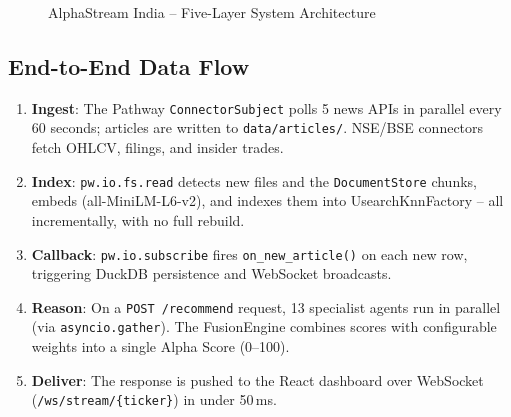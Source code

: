 \documentclass[11pt, a4paper]{article}
\begin{document}
\begin{figure}[H]
\caption{AlphaStream India -- Five-Layer System Architecture}
\end{figure}

\subsection{End-to-End Data Flow}

\begin{enumerate}[leftmargin=1.8em, itemsep=3pt]
  \item \textbf{Ingest}: The Pathway \texttt{ConnectorSubject} polls 5 news APIs in
        parallel every 60 seconds; articles are written to \texttt{data/articles/}.
        NSE/BSE connectors fetch OHLCV, filings, and insider trades.
  \item \textbf{Index}: \texttt{pw.io.fs.read} detects new files and the
        \texttt{DocumentStore} chunks, embeds (all-MiniLM-L6-v2), and indexes them
        into UsearchKnnFactory -- all incrementally, with no full rebuild.
  \item \textbf{Callback}: \texttt{pw.io.subscribe} fires \texttt{on\_new\_article()}
        on each new row, triggering DuckDB persistence and WebSocket broadcasts.
  \item \textbf{Reason}: On a \texttt{POST /recommend} request, 13 specialist agents
        run in parallel (via \texttt{asyncio.gather}). The FusionEngine combines scores
        with configurable weights into a single Alpha Score (0--100).
  \item \textbf{Deliver}: The response is pushed to the React dashboard over
        WebSocket (\texttt{/ws/stream/\{ticker\}}) in under 50\,ms.
\end{enumerate}
\end{document}
